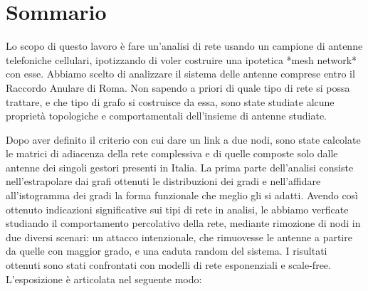 
{}
\section*{Sommario}

Lo scopo di questo lavoro è fare un'analisi di rete usando un campione di antenne telefoniche cellulari, ipotizzando di voler costruire una ipotetica *mesh network* con esse. Abbiamo scelto di analizzare il sistema delle antenne comprese entro il Raccordo Anulare di Roma. Non sapendo a priori di quale tipo di rete si possa trattare, e che tipo di grafo si costruisce da essa, sono state studiate alcune proprietà topologiche e comportamentali dell'insieme di antenne studiate.

Dopo aver definito il criterio con cui dare un link a due nodi, sono state calcolate le matrici di adiacenza della rete complessiva e di quelle composte solo dalle antenne dei singoli gestori presenti in Italia. La prima parte dell'analisi consiste nell'estrapolare dai grafi ottenuti le distribuzioni dei gradi e nell'affidare all'istogramma dei gradi la forma funzionale che meglio gli si adatti. Avendo così ottenuto indicazioni significative sui tipi di rete in analisi, le abbiamo verficate studiando il comportamento percolativo della rete, mediante rimozione di nodi in due diversi scenari: un attacco intenzionale, che rimuovesse le antenne a partire da quelle con maggior grado, e una caduta random del sistema. I risultati ottenuti sono stati confrontati con modelli di rete esponenziali e scale-free.
L'esposizione è articolata nel seguente modo:

